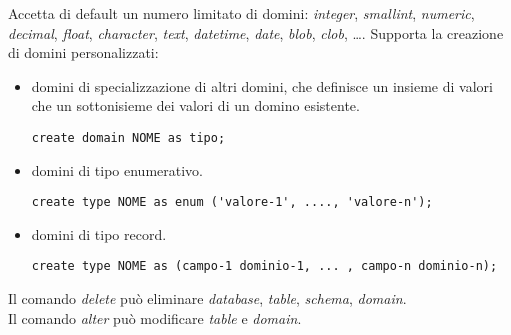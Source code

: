 Accetta di default un numero limitato di domini: \textit{integer}, \textit{smallint}, \textit{numeric}, \textit{decimal}, \textit{float}, \textit{character}, \textit{text}, \textit{datetime}, \textit{date}, \textit{blob}, \textit{clob}, \ldots .
Supporta la creazione di domini personalizzati:
\begin{itemize}
	\item domini di specializzazione di altri domini, che definisce un insieme di valori che un sottonisieme dei valori di un domino esistente.
	\begin{lstlisting}
create domain NOME as tipo;
	\end{lstlisting}
	\item domini di tipo enumerativo.
	\begin{lstlisting}
create type NOME as enum ('valore-1', ...., 'valore-n');
	\end{lstlisting}
	\item domini di tipo record.
	\begin{lstlisting}
create type NOME as (campo-1 dominio-1, ... , campo-n dominio-n);
	\end{lstlisting}
\end{itemize}

Il comando \textit{delete} può eliminare \textit{database}, \textit{table}, \textit{schema}, \textit{domain}. \\
Il comando \textit{alter} può modificare \textit{table} e \textit{domain}.